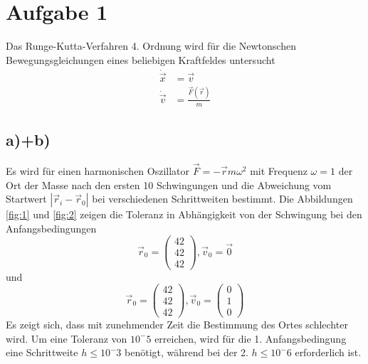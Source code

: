 \section*{Aufgabe 1}

Das Runge-Kutta-Verfahren 4. Ordnung wird für die Newtonschen Bewegungsgleichungen eines beliebigen Kraftfeldes untersucht
\begin{align*}
\dot{\vec{x}} &= \vec{v}\\
\dot{\vec{v}} &= \frac{\vec{F}(\vec{r})}{m}
\end{align*}
\subsection*{a)+b)}
Es wird für einen harmonischen Oszillator $\vec{F}= -\vec{r}m\omega^2$ mit Frequenz $\omega=1$ der Ort der Masse nach den ersten 10 Schwingungen und die Abweichung vom Startwert $|\vec{r}_i-\vec{r}_0|$ bei verschiedenen Schrittweiten bestimmt.
Die Abbildungen \ref{fig:1} und \ref{fig:2} zeigen die Toleranz in Abhängigkeit von der Schwingung bei den Anfangsbedingungen
\begin{equation}
\vec{r}_0 = \begin{pmatrix}
42\\
42\\
42
\end{pmatrix}, \vec{v}_0 = \vec{0}\label{eq:1}
\end{equation}
und
\begin{equation}
\vec{r}_0 = \begin{pmatrix}
42\\
42\\
42
\end{pmatrix}, \vec{v}_0 = \begin{pmatrix}
0\\
1\\
0
\end{pmatrix}\label{eq:2}
\end{equation}
Es zeigt sich, dass mit zunehmender Zeit die Bestimmung des Ortes schlechter wird. Um eine Toleranz von $10^-5$ erreichen, wird für die 1. Anfangsbedingung eine Schrittweite $h \leq 10^-3$ benötigt, während bei der 2. $h \leq 10^-6$ erforderlich ist.

